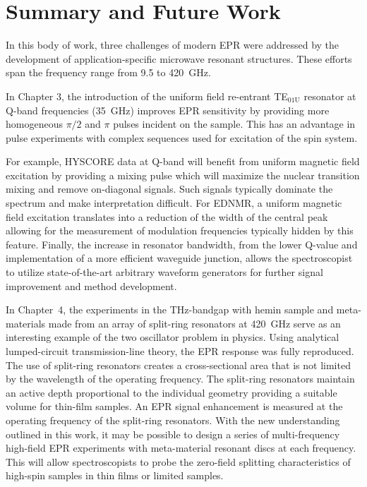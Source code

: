 \chapter[Summary and Future Work]{Summary and Future Work}

In this body of work, three challenges of modern EPR were addressed by the development of application-specific microwave resonant structures. These efforts span the frequency range from 9.5 to 420~GHz.

In Chapter 3, the introduction of the uniform field re-entrant TE$_{\text{01U}}$ resonator at Q-band frequencies (35~GHz) improves EPR sensitivity by providing more homogeneous $\pi/2$ and $\pi$ pulses incident on the sample. This has an advantage in pulse experiments with complex sequences used for excitation of the spin system. 

For example, HYSCORE data at Q-band will benefit from uniform magnetic field excitation by providing a mixing pulse which will maximize the nuclear transition mixing and remove on-diagonal signals. \cite{Doorslaer2007,Harmer2009} Such signals typically dominate the spectrum and make interpretation difficult. For EDNMR, a uniform magnetic field excitation translates into a reduction of the width of the central peak allowing for the measurement of modulation frequencies typically hidden by this feature. \cite{NicholasCox2013} Finally, the increase in resonator bandwidth, from the lower Q-value and implementation of a more efficient waveguide junction, allows the spectroscopist to utilize state-of-the-art arbitrary waveform generators for further signal improvement and method development. \cite{DOLL201327,dSegawa2015,SPINDLER201730,WILI201826,PRISNER201998}

In Chapter~4, the experiments in the THz-bandgap with hemin sample and meta-materials made from an array of split-ring resonators at 420~GHz serve as an interesting example of the two oscillator problem in physics. Using analytical lumped-circuit transmission-line theory, the EPR response was fully reproduced. The use of split-ring resonators creates a cross-sectional area that is not limited by the wavelength of the operating frequency. The split-ring resonators maintain an active depth proportional to the individual geometry providing a suitable volume for thin-film samples. An EPR signal enhancement is measured at the operating frequency of the split-ring resonators. With the new understanding outlined in this work, it may be possible to design a series of multi-frequency high-field EPR experiments with meta-material resonant discs at each frequency. This will allow spectroscopists to probe the zero-field splitting characteristics of high-spin samples in thin films or limited samples.

